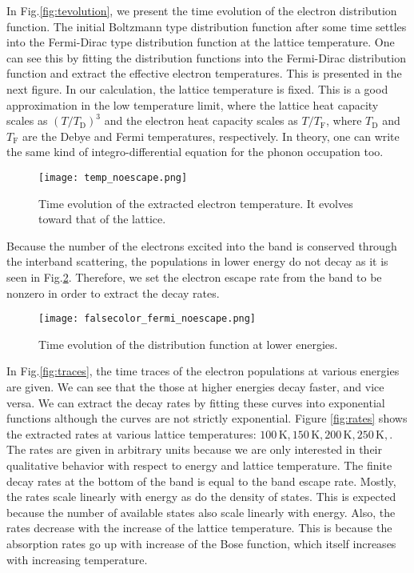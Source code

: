 \documentclass[aps,prl,twocolumn,showpacs,floatfix,superscriptaddress]{revtex4-1}
\begin{document}
In Fig.\ref{fig:tevolution}, we present the time evolution of the electron distribution function. The initial Boltzmann type distribution function after some time settles into the Fermi-Dirac type distribution function at the lattice temperature. One can see this by fitting the distribution functions into the Fermi-Dirac distribution function and extract the effective electron temperatures. This is presented in the next figure. In our calculation, the lattice temperature is fixed. This is a good approximation in the low temperature limit, where the lattice heat capacity scales as $(T/T_\mathrm{D})^3$ and the electron heat capacity scales as $T/T_\mathrm{F}$, where $T_\mathrm{D}$ and $T_\mathrm{F}$ are the Debye and Fermi temperatures, respectively. In theory, one can write the same kind of integro-differential equation for the phonon occupation too.

\begin{figure}
        \texttt{[image: temp\_noescape.png]}
        \caption{Time evolution of the extracted electron temperature. It evolves toward that of the lattice.}
        \label{fig:temp}
\end{figure}

Because the number of the electrons excited into the band is conserved through the interband scattering, the populations in lower energy do not decay as it is seen in Fig.\ref{fig:false_color}. Therefore, we set the electron escape rate from the band to be nonzero in order to extract the decay rates.
 
\begin{figure}
        \texttt{[image: falsecolor\_fermi\_noescape.png]}
        \caption{Time evolution of the distribution function at lower energies.}
        \label{fig:false_color}
\end{figure}

In Fig.\ref{fig:traces}, the time traces of the electron populations at various energies are given. We can see that the those at higher energies decay faster, and vice versa. We can extract the decay rates by fitting these curves into exponential functions although the curves are not strictly exponential. Figure \ref{fig:rates} shows the extracted rates at various lattice temperatures: $100\,\mathrm{K}, 150\,\mathrm{K}, 200\,\mathrm{K}, 250\,\mathrm{K}, $. The rates are given in arbitrary units because we are only interested in their qualitative behavior with respect to energy and lattice temperature. The finite decay rates at the bottom of the band is equal to the band escape rate. Mostly, the rates scale linearly with energy as do the density of states. This is expected because the number of available states also scale linearly with energy. Also, the rates decrease with the increase of the lattice temperature. This is because the absorption rates go up with increase of the Bose function, which itself increases with increasing temperature.   
\end{document}
